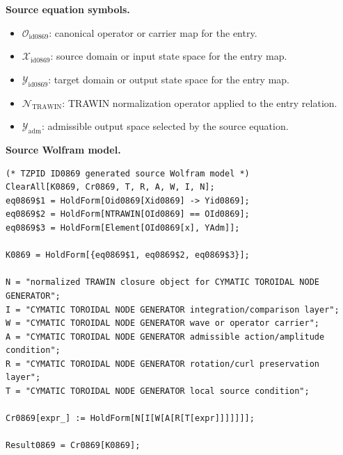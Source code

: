\begin{minipage}[t]{0.49\linewidth}
\begingroup
\small
\raggedright
\textbf{Source equation symbols.}\par
\begin{itemize}[leftmargin=1.35em,itemsep=1pt,topsep=1pt,parsep=0pt]
    \item $\mathcal{O}_{\mathrm{id0869}}$: canonical operator or carrier map for the entry.
    \item $\mathcal{X}_{\mathrm{id0869}}$: source domain or input state space for the entry map.
    \item $\mathcal{Y}_{\mathrm{id0869}}$: target domain or output state space for the entry map.
    \item $\mathcal{N}_{\mathrm{TRAWIN}}$: TRAWIN normalization operator applied to the entry relation.
    \item $\mathcal{Y}_{\mathrm{adm}}$: admissible output space selected by the source equation.
\end{itemize}
\endgroup
\end{minipage}\hfill
\begin{minipage}[t]{0.47\linewidth}
\begingroup
\scriptsize
\raggedright
\textbf{Source Wolfram model.}\par
\begin{Verbatim}[fontsize=\tiny,breaklines=true,breakanywhere=true]
(* TZPID ID0869 generated source Wolfram model *)
ClearAll[K0869, Cr0869, T, R, A, W, I, N];
eq0869$1 = HoldForm[Oid0869[Xid0869] -> Yid0869];
eq0869$2 = HoldForm[NTRAWIN[OId0869] == OId0869];
eq0869$3 = HoldForm[Element[OId0869[x], YAdm]];

K0869 = HoldForm[{eq0869$1, eq0869$2, eq0869$3}];

N = "normalized TRAWIN closure object for CYMATIC TOROIDAL NODE GENERATOR";
I = "CYMATIC TOROIDAL NODE GENERATOR integration/comparison layer";
W = "CYMATIC TOROIDAL NODE GENERATOR wave or operator carrier";
A = "CYMATIC TOROIDAL NODE GENERATOR admissible action/amplitude condition";
R = "CYMATIC TOROIDAL NODE GENERATOR rotation/curl preservation layer";
T = "CYMATIC TOROIDAL NODE GENERATOR local source condition";

Cr0869[expr_] := HoldForm[N[I[W[A[R[T[expr]]]]]]];

Result0869 = Cr0869[K0869];
\end{Verbatim}
\endgroup
\end{minipage}

